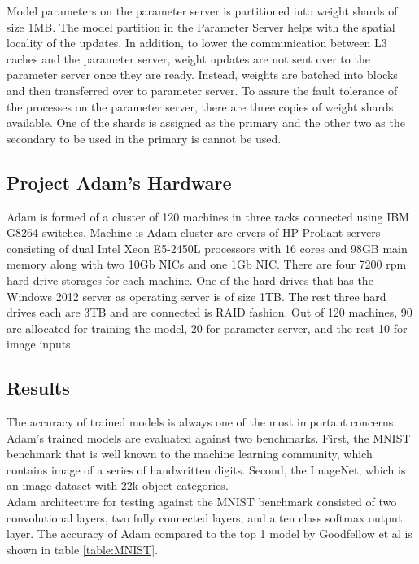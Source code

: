 \documentclass[runningheads,a4paper]{llncs}
\begin{document}
Model parameters on the parameter server is partitioned into weight shards of size 1MB. The model partition in the Parameter Server helps with the spatial locality of the updates. In addition, to lower the communication between L3 caches and the parameter server, weight updates are not sent over to the parameter server once they are ready. Instead, weights are batched into blocks and then transferred over to parameter server. To assure the fault tolerance of the processes on the parameter server, there are three copies of weight shards available. One of the shards is assigned as the primary and the other two as the secondary to be used in the primary is cannot be used.

\subsection*{Project Adam's Hardware} Adam is formed of a cluster of 120 machines in three racks connected using IBM G8264 switches. Machine is Adam cluster are ervers of HP Proliant servers consisting of dual Intel Xeon E5-2450L processors with 16 cores and 98GB main memory along with two 10Gb NICs and one 1Gb NIC. There are four 7200 rpm hard drive storages for each machine. One of the hard drives that has the Windows 2012 server as operating server is of size 1TB. The rest three hard drives each are 3TB and are connected is RAID fashion. Out of 120 machines, 90 are allocated for training the model, 20 for parameter server, and the rest 10 for image inputs.

\subsection*{Results}

The accuracy of trained models is always one of the most important concerns. Adam's trained models are evaluated against two benchmarks. First, the MNIST benchmark that is well known to the machine learning community, which contains image of a series of handwritten digits. Second, the ImageNet, which is an image dataset with 22k object categories.\\

Adam architecture for testing against the MNIST benchmark consisted of two convolutional layers, two fully connected layers, and a ten class softmax output layer\cite{simard2003best}. The accuracy of Adam compared to the top 1  model by Goodfellow et al \cite{goodfellow2013maxout} is shown in table \ref{table:MNIST}.
\end{document}
